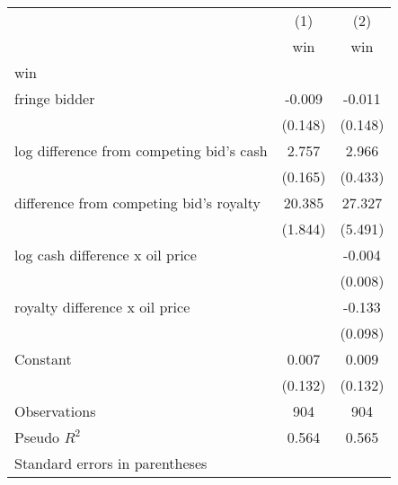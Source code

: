 \begin{tabular}{l*{2}{c}}
\hline\hline
                    &\multicolumn{1}{c}{(1)}&\multicolumn{1}{c}{(2)}\\
                    &\multicolumn{1}{c}{win}&\multicolumn{1}{c}{win}\\
\hline
win                 &            &            \\
fringe bidder       &      -0.009&      -0.011\\
                    &     (0.148)&     (0.148)\\
[1em]
log difference from competing bid's cash&       2.757&       2.966\\
                    &     (0.165)&     (0.433)\\
[1em]
difference from competing bid's royalty&      20.385&      27.327\\
                    &     (1.844)&     (5.491)\\
[1em]
log cash difference x oil price&            &      -0.004\\
                    &            &     (0.008)\\
[1em]
royalty difference x oil price&            &      -0.133\\
                    &            &     (0.098)\\
[1em]
Constant            &       0.007&       0.009\\
                    &     (0.132)&     (0.132)\\
\hline
Observations        &         904&         904\\
Pseudo \(R^{2}\)    &       0.564&       0.565\\
\hline\hline
\multicolumn{3}{l}{\footnotesize Standard errors in parentheses}\\
\end{tabular}
